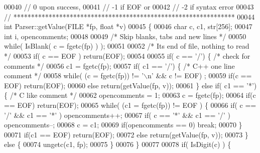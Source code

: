 \begin{DoxyCode}
00040 \textcolor{comment}{//      0 upon success,}
00041 \textcolor{comment}{//      -1 if EOF or}
00042 \textcolor{comment}{//      -2 if syntax error}
00043 \textcolor{comment}{// ***************************************************************}
00044 \textcolor{keywordtype}{int} Parser::getValue(FILE *fp, \textcolor{keywordtype}{float} *v)
00045 \{
00046     \textcolor{keywordtype}{char} c, c1, str[256];
00047     \textcolor{keywordtype}{int} i, opencomments;
00048 
00049     \textcolor{comment}{/* Skip blanks, tabs and new lines */}
00050     \textcolor{keywordflow}{while}( IsBlank( c = fgetc(fp) ) );
00051 
00052     \textcolor{comment}{/* Its end of file, nothing to read */}
00053     \textcolor{keywordflow}{if}( c == EOF ) \textcolor{keywordflow}{return}(EOF);
00054 
00055     \textcolor{keywordflow}{if}( c == \textcolor{charliteral}{'/'}) \{         \textcolor{comment}{/* check for comments */}
00056         c1 = fgetc(fp);
00057         \textcolor{keywordflow}{if}( c1 == \textcolor{charliteral}{'/'}) \{    \textcolor{comment}{/* C++ one line comment */}
00058             \textcolor{keywordflow}{while}( (c = fgetc(fp)) != \textcolor{charliteral}{'\(\backslash\)n'} && c != EOF) ;
00059             \textcolor{keywordflow}{if}(c == EOF) \textcolor{keywordflow}{return}(EOF);
00060             \textcolor{keywordflow}{else} \textcolor{keywordflow}{return}(getValue(fp, v));
00061         \} \textcolor{keywordflow}{else} \textcolor{keywordflow}{if}( c1 == \textcolor{charliteral}{'*'}) \{     \textcolor{comment}{/* C like comment */}
00062             opencomments = 1;
00063             c = fgetc(fp);
00064             \textcolor{keywordflow}{if}(c == EOF) \textcolor{keywordflow}{return}(EOF);
00065             \textcolor{keywordflow}{while}( (c1 = fgetc(fp)) != EOF ) \{
00066                 \textcolor{keywordflow}{if}( c == \textcolor{charliteral}{'/'} && c1 == \textcolor{charliteral}{'*'} ) opencomments++;
00067                 \textcolor{keywordflow}{if}( c == \textcolor{charliteral}{'*'} && c1 == \textcolor{charliteral}{'/'} ) opencomments--;
00068                 c = c1;
00069                 \textcolor{keywordflow}{if}(opencomments == 0) \textcolor{keywordflow}{break};
00070             \}
00071             \textcolor{keywordflow}{if}(c1 == EOF) \textcolor{keywordflow}{return}(EOF);
00072             \textcolor{keywordflow}{else} \textcolor{keywordflow}{return}(getValue(fp, v));
00073         \} \textcolor{keywordflow}{else} \{
00074             ungetc(c1, fp);
00075         \}
00076     \}
00077 
00078     \textcolor{keywordflow}{if}( IsDigit(c) ) \{

\end{DoxyCode}
